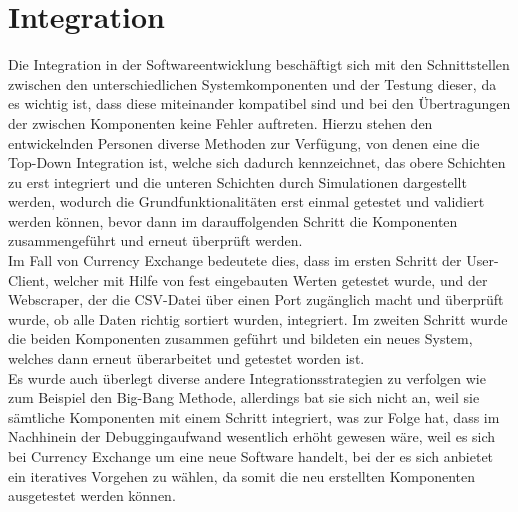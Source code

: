 \documentclass[conference]{IEEEtran}
\begin{document}
\section{Integration}
Die Integration in der Softwareentwicklung beschäftigt sich mit den Schnittstellen zwischen den unterschiedlichen Systemkomponenten und der Testung dieser, da es wichtig ist, dass diese miteinander kompatibel sind und bei den Übertragungen der zwischen Komponenten keine Fehler auftreten. Hierzu stehen den entwickelnden Personen diverse Methoden zur Verfügung, von denen eine die Top-Down Integration ist, welche sich dadurch kennzeichnet, das obere Schichten zu erst integriert und die unteren Schichten durch Simulationen dargestellt werden, wodurch die Grundfunktionalitäten erst einmal getestet und validiert werden können, bevor dann im darauffolgenden Schritt die Komponenten zusammengeführt und erneut überprüft werden.\\
Im Fall von Currency Exchange bedeutete dies, dass im ersten Schritt der User-Client, welcher mit Hilfe von fest eingebauten Werten getestet wurde, und der Webscraper, der die CSV-Datei über einen Port zugänglich macht und überprüft wurde, ob alle Daten richtig sortiert wurden, integriert. Im zweiten Schritt wurde die beiden Komponenten zusammen geführt und bildeten ein neues System, welches dann erneut überarbeitet und getestet worden ist. \\
Es wurde auch überlegt diverse andere Integrationsstrategien zu verfolgen wie zum Beispiel den Big-Bang Methode, allerdings bat sie sich nicht an, weil sie sämtliche Komponenten mit einem Schritt integriert, was zur Folge hat, dass im Nachhinein der Debuggingaufwand wesentlich erhöht gewesen wäre, weil es sich bei Currency Exchange um eine neue Software handelt, bei der es sich anbietet ein iteratives Vorgehen zu wählen, da somit die neu erstellten Komponenten ausgetestet werden können.
\end{document}
